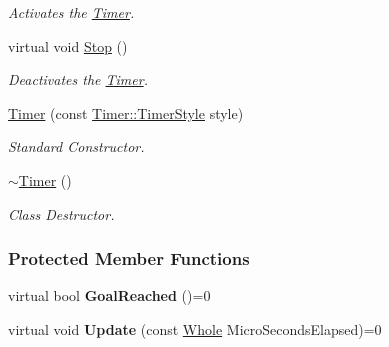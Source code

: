 \begin{DoxyCompactItemize}
\begin{DoxyCompactList}\small\item\em Activates the \hyperlink{classphys_1_1Timer}{Timer}. \item\end{DoxyCompactList}\item 
\hypertarget{classphys_1_1Timer_aa934478424678f84e8f4afb472eebbae}{
virtual void \hyperlink{classphys_1_1Timer_aa934478424678f84e8f4afb472eebbae}{Stop} ()}
\label{classphys_1_1Timer_aa934478424678f84e8f4afb472eebbae}

\begin{DoxyCompactList}\small\item\em Deactivates the \hyperlink{classphys_1_1Timer}{Timer}. \item\end{DoxyCompactList}\item 
\hyperlink{classphys_1_1Timer_a25b70d2d45c5c56cce475841b7b18cd0}{Timer} (const \hyperlink{classphys_1_1Timer_a1ee86bf43e20329d750c5d582dcce329}{Timer::TimerStyle} style)
\begin{DoxyCompactList}\small\item\em Standard Constructor. \item\end{DoxyCompactList}\item 
\hypertarget{classphys_1_1Timer_ab96eede362c41f1ab56f1530cbae22b8}{
\hyperlink{classphys_1_1Timer_ab96eede362c41f1ab56f1530cbae22b8}{$\sim$Timer} ()}
\label{classphys_1_1Timer_ab96eede362c41f1ab56f1530cbae22b8}

\begin{DoxyCompactList}\small\item\em Class Destructor. \item\end{DoxyCompactList}\end{DoxyCompactItemize}
\subsubsection*{Protected Member Functions}
\begin{DoxyCompactItemize}
\item 
\hypertarget{classphys_1_1Timer_a636d546064abe43b1c549efaca777613}{
virtual bool {\bfseries GoalReached} ()=0}
\label{classphys_1_1Timer_a636d546064abe43b1c549efaca777613}

\item 
\hypertarget{classphys_1_1Timer_a45d7e290f9cb8c03f2376e48ff794f24}{
virtual void {\bfseries Update} (const \hyperlink{namespacephys_a460f6bc24c8dd347b05e0366ae34f34a}{Whole} MicroSecondsElapsed)=0}
\label{classphys_1_1Timer_a45d7e290f9cb8c03f2376e48ff794f24}

\end{DoxyCompactItemize}
